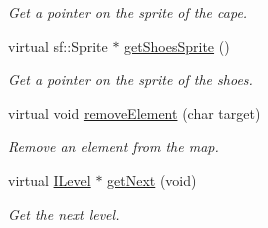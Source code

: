 \begin{DoxyCompactItemize}
\begin{DoxyCompactList}\small\item\em Get a pointer on the sprite of the cape. \end{DoxyCompactList}\item 
virtual sf\-::\-Sprite $\ast$ \hyperlink{class_level_one_ab7b81a5ee8299a900494439e470e0f17}{get\-Shoes\-Sprite} ()
\begin{DoxyCompactList}\small\item\em Get a pointer on the sprite of the shoes. \end{DoxyCompactList}\item 
virtual void \hyperlink{class_level_one_a601628107a9810e5c323dc994d7c07ec}{remove\-Element} (char target)
\begin{DoxyCompactList}\small\item\em Remove an element from the map. \end{DoxyCompactList}\item 
virtual \hyperlink{class_i_level}{I\-Level} $\ast$ \hyperlink{class_level_one_a02759e21a744625e01f936e529b0e8f1}{get\-Next} (void)
\begin{DoxyCompactList}\small\item\em Get the next level. \end{DoxyCompactList}\end{DoxyCompactItemize}
